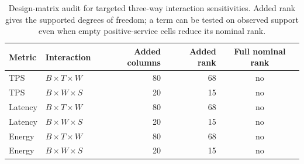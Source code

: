 \begin{table}[t]
\centering
\caption{Design-matrix audit for targeted three-way interaction sensitivities. Added rank gives the supported degrees of freedom; a term can be tested on observed support even when empty positive-service cells reduce its nominal rank.}
\label{tab:three_way_estimability}
\TableFont
\begin{tabular}{llrrc}
\hline
Metric & Interaction & Added columns & Added rank & Full nominal rank \\
\hline
TPS & $B\times T\times W$ & 80 & 68 & no \\
TPS & $B\times W\times S$ & 20 & 15 & no \\
Latency & $B\times T\times W$ & 80 & 68 & no \\
Latency & $B\times W\times S$ & 20 & 15 & no \\
Energy & $B\times T\times W$ & 80 & 68 & no \\
Energy & $B\times W\times S$ & 20 & 15 & no \\
\hline
\end{tabular}
\end{table}
